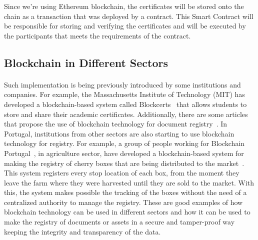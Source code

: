 Since we're using Ethereum blockchain, the certificates will be stored onto the chain as a transaction that was deployed by a contract.
This Smart Contract will be responsible for storing and verifying the certificates and will be executed by the participants that meets the requirements of the contract.

\subsection*{Blockchain in Different Sectors}\label{subsec:blockchain-different-sectors}
\paragraph{}

Such implementation is being previously introduced by some institutions and companies. For example, the Massachusetts Institute of Technology (MIT) has developed a blockchain-based system called Blockcerts~\cite{blockcerts}
that allows students to store and share their academic certificates. Additionally, there are some articles that propose the use of blockchain technology for document registry~\cite{app112411811, app14020706}.
In Portugal, institutions from other sectors are also starting to use blockchain technology for registry. For example, a group of people working for Blockchain Portugal~\cite{blockchainPortugal}, in agriculture sector,
have developed a blockchain-based system for making the registry of cherry boxes that are being distributed to the market~\cite{tertuliaCereja}.
This system registers every stop location of each box, from the moment they leave the farm where they were harvested until they are sold to the market. With this, the system makes possible the tracking of the boxes without the need of a centralized authority to manage the registry.
These are good examples of how blockchain technology can be used in different sectors and how it can be used to make the registry of documents or assets in a secure and tamper-proof way keeping the integrity and transparency of the data.